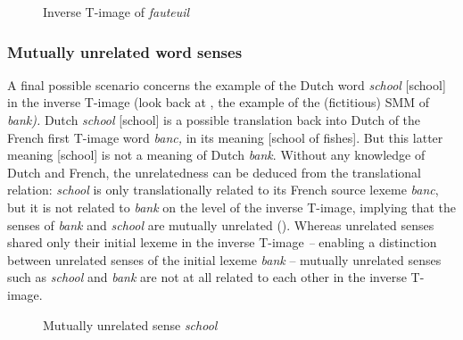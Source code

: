 \begin{figure}
\caption{\label{fig:3:13}Inverse T-image of \textit{fauteuil}}
\end{figure}

\subsubsection{Mutually unrelated word senses}
\label{sec:3.4.3.3}
A final possible scenario concerns the example of the Dutch word \textit{school} [school] in the inverse T-image (look back at , the example of the (fictitious) SMM of \textit{bank).} Dutch \textit{school} [school] is a possible translation back into Dutch of the French first T-image word \textit{banc,} in its meaning [school of fishes]. But this latter meaning [school] is not a meaning of Dutch \textit{bank}. Without any knowledge of Dutch and French, the unrelatedness can be deduced from the translational relation: \textit{school} is only translationally related to its French source lexeme \textit{banc}, but it is not related to \textit{bank} on the level of the inverse T-image, implying that the senses of \textit{bank} and \textit{school} are mutually unrelated (). Whereas unrelated senses shared only their initial lexeme in the inverse T-image \textit{–} enabling a distinction between unrelated senses of the initial lexeme \textit{bank} -- mutually unrelated senses such as \textit{school} and \textit{bank} are not at all related to each other in the inverse T-image.

\begin{figure}
\caption{\label{fig:3:14}  Mutually unrelated sense \textit{school}}
\end{figure}

